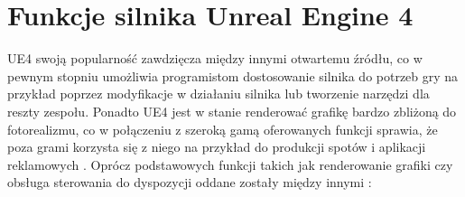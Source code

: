 \documentclass[multip]{SGGW-thesis}
\begin{document}
\section{Funkcje silnika Unreal Engine 4}
UE4 swoją popularność zawdzięcza między innymi otwartemu źródłu, co w pewnym stopniu umożliwia programistom dostosowanie silnika do potrzeb gry na przykład poprzez modyfikacje w działaniu silnika lub tworzenie narzędzi dla reszty zespołu. Ponadto UE4 jest w stanie renderować grafikę bardzo zbliżoną do fotorealizmu, co w połączeniu z szeroką gamą oferowanych funkcji sprawia, że poza grami korzysta się z niego na przykład do produkcji spotów i aplikacji reklamowych \cite{the-human-race}\cite{ikea-vr}.
\newline \indent Oprócz podstawowych funkcji takich jak renderowanie grafiki czy obsługa sterowania do dyspozycji oddane zostały między innymi \cite{docs-ue4-features}:
\end{document}
